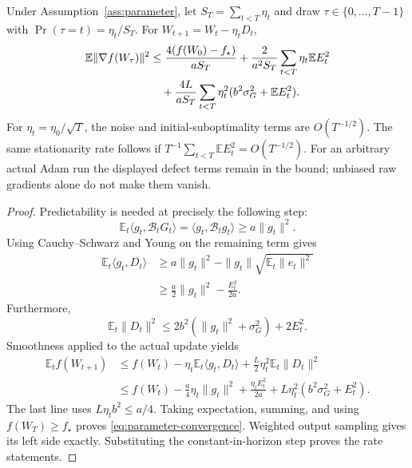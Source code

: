 \begin{theorem}
\label{thm:convergence}
Under Assumption~\ref{ass:parameter}, let
$S_T=\sum_{t<T}\eta_t$ and draw $\tau\in\{0,\ldots,T-1\}$ with
$\Pr(\tau=t)=\eta_t/S_T$. For
$W_{t+1}=W_t-\eta_tD_t$,
\begin{align}
 \mathbb E\|\nabla f(W_\tau)\|^2
 &\le\frac{4(f(W_0)-f_\star)}{aS_T}
       +\frac{2}{a^2S_T}\sum_{t<T}\eta_t\mathbb E E_t^2\notag\\
 &\quad+\frac{4L}{aS_T}\sum_{t<T}\eta_t^2
                         (b^2\sigma_G^2+\mathbb EE_t^2).
 \label{eq:parameter-convergence}
\end{align}
For $\eta_t=\eta_0/\sqrt T$, the noise and initial-suboptimality terms
are $O(T^{-1/2})$. The same stationarity rate follows if
$T^{-1}\sum_{t<T}\mathbb EE_t^2=O(T^{-1/2})$.
For an arbitrary actual Adam run the displayed defect terms remain in the
bound; unbiased raw gradients alone do not make them vanish.
\end{theorem}

\begin{proof}
Predictability is needed at precisely the following step:
\begin{equation}
 \mathbb E_t\langle g_t,\mathcal B_tG_t\rangle
 =\langle g_t,\mathcal B_tg_t\rangle\ge a\|g_t\|^2.
\end{equation}
Using Cauchy--Schwarz and Young on the remaining term gives
\begin{align}
 \mathbb E_t\langle g_t,D_t\rangle
 &\ge a\|g_t\|^2-\|g_t\|\sqrt{\mathbb E_t\|e_t\|^2}\\
 &\ge\tfrac a2\|g_t\|^2-\tfrac{E_t^2}{2a}.
 \label{eq:alignment-bound}
\end{align}
Furthermore,
\begin{equation}
 \mathbb E_t\|D_t\|^2
 \le2b^2(\|g_t\|^2+\sigma_G^2)+2E_t^2.
 \label{eq:direction-bound}
\end{equation}
Smoothness applied to the actual update yields
\begin{align}
 \mathbb E_tf(W_{t+1})
 &\le f(W_t)-\eta_t\mathbb E_t\langle g_t,D_t\rangle
                   +\tfrac L2\eta_t^2\mathbb E_t\|D_t\|^2\\
 &\le f(W_t)-\tfrac a4\eta_t\|g_t\|^2
      +\tfrac{\eta_tE_t^2}{2a}
      +L\eta_t^2(b^2\sigma_G^2+E_t^2).
\end{align}
The last line uses $L\eta_tb^2\le a/4$.
Taking expectation, summing, and using $f(W_T)\ge f_\star$ proves
\eqref{eq:parameter-convergence}. Weighted output sampling gives its
left side exactly. Substituting the constant-in-horizon step proves the
rate statements.
\end{proof}

